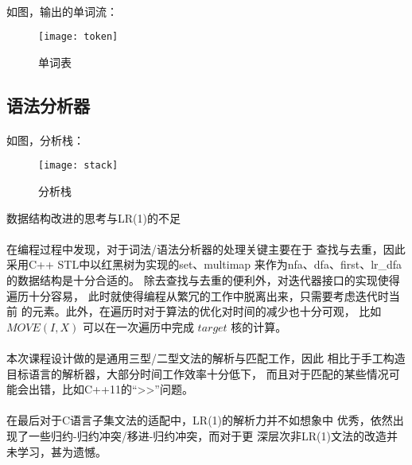 \documentclass[UTF8]{ctexart}
\makeatletter
\renewcommand{\section}{\@startsection{section}{1}{0mm}
	{-\baselineskip}{0.5\baselineskip}{\bf\leftline}}
\makeatother
\begin{document}
	\paragraph{} %
	如图，输出的单词流：
	\begin{figure}[htbp] 
		\centering\texttt{[image: token]} 
		\caption{单词表}\label{token:1} 
	\end{figure}
	\subsection{语法分析器} %
	\label{sub:c_grammar_analyzier}
	\paragraph{} %
	如图，分析栈：
	\begin{figure}[htbp] 
		\centering\texttt{[image: stack]} 
		\caption{分析栈}\label{stack:1} 
	\end{figure}
	\section{数据结构改进的思考与LR(1)的不足} %
	\label{sec:_lr}
	\paragraph{} %
	在编程过程中发现，对于词法/语法分析器的处理关键主要在于
	查找与去重，因此采用C++ STL中以红黑树为实现的set、multimap
	来作为nfa、dfa、first、lr\_dfa的数据结构是十分合适的。
	除去查找与去重的便利外，对迭代器接口的实现使得遍历十分容易，
	此时就使得编程从繁冗的工作中脱离出来，只需要考虑迭代时当前
	的元素。此外，在遍历时对于算法的优化对时间的减少也十分可观，
	比如 $MOVE(I, X)$ 可以在一次遍历中完成 $target$ 核的计算。
	\paragraph{} %
	本次课程设计做的是通用三型/二型文法的解析与匹配工作，因此
	相比于手工构造目标语言的解析器，大部分时间工作效率十分低下，
	而且对于匹配的某些情况可能会出错，比如C++11的“>>”问题。
	\paragraph{} %
	在最后对于C语言子集文法的适配中，LR(1)的解析力并不如想象中
	优秀，依然出现了一些归约-归约冲突/移进-归约冲突，而对于更
	深层次非LR(1)文法的改造并未学习，甚为遗憾。
\end{document}
